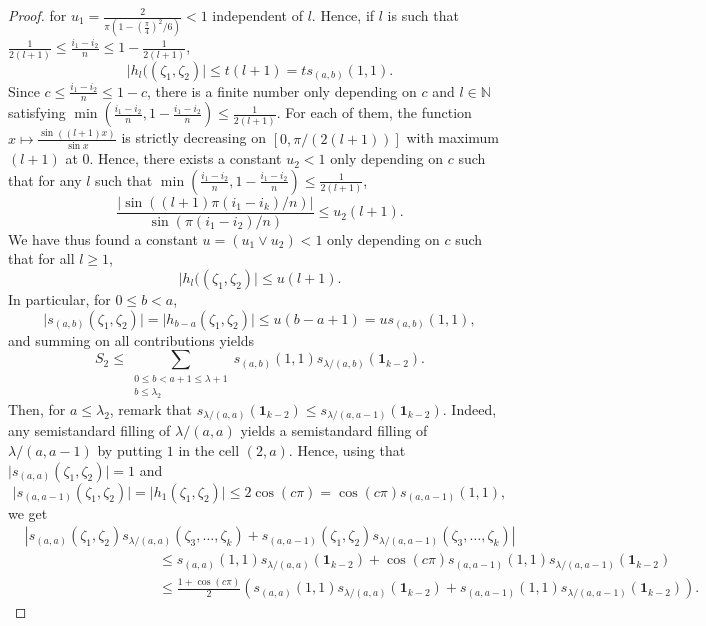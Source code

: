 \documentclass[10pt,11pt]{amsart}%
\def \b{\beta}
\begin{document}
\begin{proof}
for $u_1=\frac{2}{\pi\left(1-\left(\frac{\pi}{4}\right)^2/6\right)}<1$ independent of $l$. Hence, if $l$ is such that $\frac{1}{2(l+1)} \leq\frac{i_1-i_2}{n}\leq 1-\frac{1}{2(l+1)}$, 
$$\vert h_l((\zeta_1,\zeta_2)\vert\leq t(l+1)=ts_{(a,b)}(1,1).$$
Since $c \leq\frac{i_1-i_2}{n}\leq 1-c$, there is a finite number only depending on $c$ and $l\in \mathbb{N}$ satisfying $\min\left(\frac{i_1-i_2}{n},1-\frac{i_1-i_2}{n}\right)\leq \frac{1}{2(l+1)} $. For each of them, the function $x\mapsto\frac{\sin((l+1)x)}{\sin x}$ is strictly decreasing on $[0,\pi/(2(l+1))]$ with maximum $(l+1)$ at $0$. Hence, there exists a constant $u_2<1$ only depending on $c$ such that for any $l$ such that  $\min\left(\frac{i_1-i_2}{n},1-\frac{i_1-i_2}{n}\right)\leq \frac{1}{2(l+1)} $,
$$\frac{\vert \sin((l+1)\pi(i_1-i_k)/n)\vert}{\sin(\pi(i_1-i_2)/n)}\leq u_2(l+1).$$
We have thus found a constant $u=(u_1\vee u_2)<1$ only depending on $c$ such that for all $l\geq 1$,
\begin{equation}\label{eq:bound_h_2}
\vert h_l((\zeta_1,\zeta_2)\vert\leq u(l+1).
\end{equation}
In particular, for $0\leq b< a$,
$$\vert s_{(a,b)}(\zeta_1,\zeta_2)\vert=\vert h_{b-a}(\zeta_1,\zeta_2)\vert\leq u(b-a+1)=us_{(a,b)}(1,1),$$
and summing on all contributions yields
\begin{equation}\label{eq:lemma_large_S_2}
S_2\leq \sum_{\substack{0\leq b< a+1\leq \lambda+1\\b\leq \lambda_2}} s_{(a,b)}(1,1)s_{\lambda/(a,b)}(\mathbf{1}_{k-2}).
\end{equation}
Then, for $a\leq \lambda_2$, remark that $s_{\lambda/(a,a)}(\mathbf{1}_{k-2})\leq s_{\lambda/(a,a-1)}(\mathbf{1}_{k-2})$. Indeed, any semistandard filling of $\lambda/(a,a)$ yields a semistandard filling of $\lambda/(a,a-1)$ by putting $1$ in the cell $(2,a)$. Hence, using that $\vert s_{(a,a)}(\zeta_1,\zeta_2)\vert=1$ and 
$$\vert s_{(a,a-1)}(\zeta_1,\zeta_2)\vert=\vert h_1(\zeta_1,\zeta_2)\vert\leq 2\cos(c\pi)=\cos(c\pi)s_{(a,a-1)}(1,1),$$ 
we get 
\begin{align*}
&\left\vert s_{(a,a)}(\zeta_1,\zeta_2)s_{\lambda/(a,a)}(\zeta_3,\ldots,\zeta_{k})+s_{(a,a-1)}(\zeta_1,\zeta_2)s_{\lambda/(a,a-1)}(\zeta_3,\ldots,\zeta_{k})\right\vert\\
&\hspace{4cm}\leq s_{(a,a)}(1,1)s_{\lambda/(a,a)}(\mathbf{1}_{k-2})+\cos(c\pi)s_{(a,a-1)}(1,1)s_{\lambda/(a,a-1)}(\mathbf{1}_{k-2})\\
&\hspace{4cm}\leq \frac{1+\cos(c\pi)}{2}\left(s_{(a,a)}(1,1)s_{\lambda/(a,a)}(\mathbf{1}_{k-2})+s_{(a,a-1)}(1,1)s_{\lambda/(a,a-1)}(\mathbf{1}_{k-2})\right).

\end{align*}
\end{proof}
\end{document}
